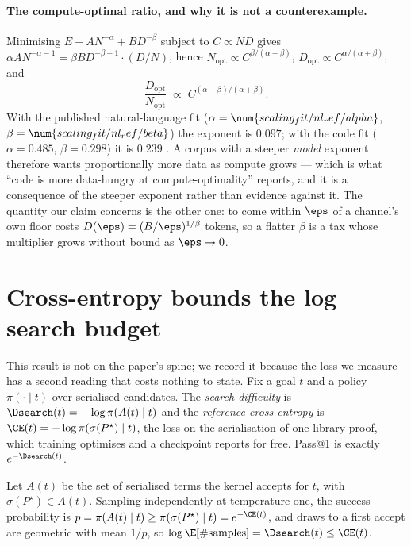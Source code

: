 \paragraph{The compute-optimal ratio, and why it is not a counterexample.}
Minimising \(E + AN^{-\alpha} + BD^{-\beta}\) subject to \(C \propto ND\) gives
\(\alpha A N^{-\alpha-1} = \beta B D^{-\beta-1} \cdot (D/N)\), hence
\(N_{\mathrm{opt}} \propto C^{\beta/(\alpha+\beta)}\),
\(D_{\mathrm{opt}} \propto C^{\alpha/(\alpha+\beta)}\), and
\[
  \frac{D_{\mathrm{opt}}}{N_{\mathrm{opt}}}
  \;\propto\; C^{(\alpha-\beta)/(\alpha+\beta)}.
\]
With the published natural-language fit (\(\alpha = \num{scaling_fit/nl_ref/alpha}\), \(\beta = \num{scaling_fit/nl_ref/beta}\))
the exponent is \(0.097\);
with the code fit (\(\alpha = 0.485\), \(\beta = 0.298\)) it is \(0.239\)
\citep{hoffmann2022chinchilla, luo2025codescalingdatahungry}.
A corpus with a steeper \emph{model} exponent therefore wants proportionally
more data as compute grows --- which is what ``code is more data-hungry at
compute-optimality'' reports, and it is a consequence of the steeper exponent
rather than evidence against it.
The quantity our claim concerns is the other one:
to come within \(\eps\) of a channel's own floor costs
\(D(\eps) = (B/\eps)^{1/\beta}\) tokens, so a flatter \(\beta\) is a tax whose
multiplier grows without bound as \(\eps \to 0\).

\section{Cross-entropy bounds the log search budget}
\label{app:search}

This result is not on the paper's spine;
we record it because the loss we measure has a second reading that costs
nothing to state.
Fix a goal \(t\) and a policy \(\pi(\cdot\mid t)\) over serialised candidates.
The \emph{search difficulty} is \(\Dsearch(t) = -\log\pi(A(t)\mid t)\) and the
\emph{reference cross-entropy} is \(\CE(t) = -\log\pi(\sigma(P^\star)\mid t)\),
the loss on the serialisation of one library proof, which training optimises and
a checkpoint reports for free.
Pass@1 is exactly \(e^{-\Dsearch(t)}\).

\begin{proposition}
\label{prop:bound}
Let \(A(t)\) be the set of serialised terms the kernel accepts for \(t\), with
\(\sigma(P^\star) \in A(t)\).
Sampling independently at temperature one, the success probability is
\(p = \pi(A(t)\mid t) \ge \pi(\sigma(P^\star)\mid t) = e^{-\CE(t)}\), and draws
to a first accept are geometric with mean \(1/p\), so
\(\log\E[\#\text{samples}] = \Dsearch(t) \le \CE(t)\).
\end{proposition}

